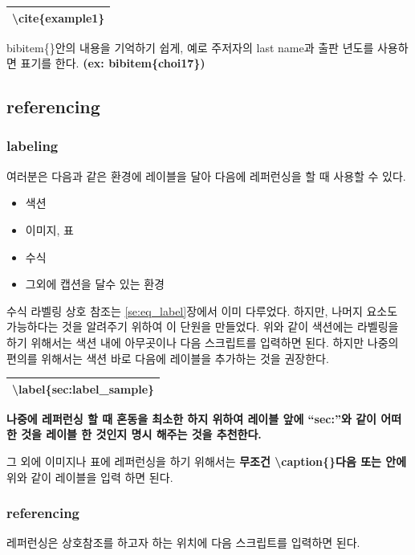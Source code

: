 \documentclass[12pt]{article}
\begin{document}
	\begin{tabularx}{\textwidth\onehalfspacing}{|X|}
		\hline
		\textbackslash cite\{example1\}\\
		\hline
	\end{tabularx}\newline\newline
	bibitem\{\}안의 내용을 기억하기 쉽게, 예로 주저자의 last name과 출판 년도를 사용하면 표기를 한다. \textbf{(ex: bibitem\{choi17\})}
	\clearpage
	\subsection{referencing}
	\subsubsection{labeling}
	여러분은 다음과 같은 환경에 레이블을 달아 다음에 레퍼런싱을 할 때 사용할 수 있다.
	\begin{itemize}
		\item 색션
		\item 이미지, 표
		\item 수식
		\item 그외에 캡션을 달수 있는 환경
	\end{itemize}
	수식 라벨링 상호 참조는 \ref{se:eq_label}장에서 이미 다루었다. 하지만, 나머지 요소도 가능하다는 것을 알려주기 위하여 이 단원을 만들었다.\newline
	위와 같이 색션에는 라벨링을 하기 위해서는 색션 내에 아무곳이나 다음 스크립트를 입력하면 된다. 하지만 나중의 편의를 위해서는 색션 바로 다음에 레이블을 추가하는 것을 권장한다.\newline
	
	\begin{tabularx}{\textwidth\onehalfspacing}{|X|}
		\hline
		\textbackslash label\{sec:label\_sample\}\\
		\hline
	\end{tabularx}\newline\newline
	\textbf{나중에 레퍼런싱 할 때 혼동을 최소한 하지 위하여 레이블 앞에 ``sec:''와 같이 어떠한 것을 레이블 한 것인지 명시 해주는 것을 추천한다.}
	
	그 외에 이미지나 표에 레퍼런싱을 하기 위해서는 \textbf{무조건 \textbackslash caption\{\}다음 또는 안에} 위와 같이 레이블을 입력 하면 된다.
	\subsubsection{referencing}
	레퍼런싱은 상호참조를 하고자 하는 위치에 다음 스크립트를 입력하면 된다.\newline
	
\end{document}
